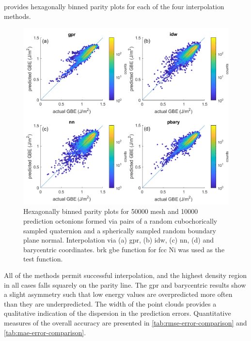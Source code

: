 \documentclass[preprint,12pt]{elsarticle}
\begin{document}
 provides hexagonally binned parity plots \cite{beanHexscatter2020} for each of the four interpolation methods.
\begin{figure}
    \centering
    \includegraphics[width=0.75\linewidth]{brkparity50000.png}
    \caption{Hexagonally binned parity plots for 50000 mesh and 10000 prediction octonions formed via pairs of a random cubochorically sampled quaternion and a spherically sampled random boundary plane normal. Interpolation via (a) \acrlong{gpr}, (b) \acrlong{idw}, (c) \acrlong{nn}, (d) and barycentric coordinates.  \acrlong{brk} \acrlong{gbe} function for \gls{fcc} Ni was used as the test function.}
    \label{fig:brkparity50000}
\end{figure}

All of the methods permit successful interpolation, and the highest density region in all cases falls squarely on the parity line. The \Gls{gpr} and barycentric results show a slight asymmetry such that low energy values are overpredicted more often than they are underpredicted. The width of the point clouds provides a qualitative indication of the dispersion in the prediction errors. Quantitative measures of the overall accuracy are presented in \cref{tab:rmse-error-comparison} and \cref{tab:mae-error-comparison}.
\end{document}

